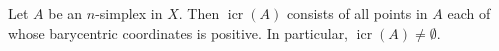 Let $A$ be an $n$-simplex in $X$. Then $\operatorname{icr}(A)$ consists of all points in $A$ each of whose barycentric coordinates is positive. In particular, $\operatorname{icr}(A) \neq \emptyset$.